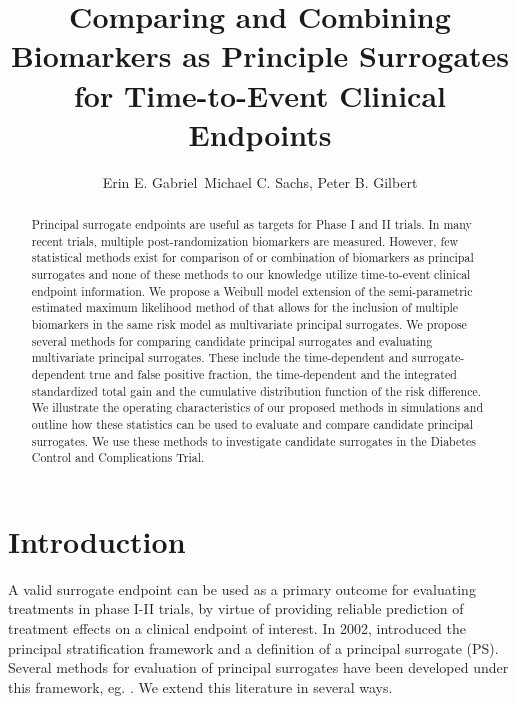 \documentclass[times, doublespace]{simauth}
\begin{document}

\title{Comparing and Combining Biomarkers as Principle Surrogates for Time-to-Event Clinical Endpoints}
\author{Erin E. Gabriel\corrauth\
Michael C. Sachs, Peter B. Gilbert}
\address{Vaccine and Infectious Disease Division, Fred Hutchinson Cancer Research Center\\
\affilnum{b}Kidney Research Institute, University of Washington\\
\affilnum{c}Department of Biostatistics, University of Washington}
\corraddr{egabriel@fhcrc.org}
\begin{abstract}
Principal surrogate endpoints are useful as targets for Phase I and II trials. In many recent trials, multiple post-randomization biomarkers are measured. However, few statistical methods exist for comparison of or combination of biomarkers as principal surrogates and none of these methods to our knowledge utilize time-to-event clinical endpoint information. We propose a Weibull model extension of the semi-parametric estimated maximum likelihood method of \citet{Huang11} that allows for the inclusion of multiple biomarkers in the same risk model as multivariate principal surrogates. We propose several methods for comparing candidate principal surrogates and evaluating multivariate principal surrogates. These include the time-dependent and surrogate-dependent true and false positive fraction, the time-dependent and the integrated standardized total gain and the cumulative distribution function of the risk difference. We illustrate the operating characteristics of our proposed methods in simulations and outline how these statistics can be used to evaluate and compare candidate principal surrogates. We use these methods to investigate candidate surrogates in the Diabetes Control and Complications Trial.
\end{abstract}
\maketitle

\section{Introduction} 
A valid surrogate endpoint can be used as a primary outcome for evaluating treatments in phase I-II trials, by virtue of providing reliable prediction of treatment effects on a clinical endpoint of interest. In 2002, \citet{Frangakis02} introduced the principal stratification framework and a definition of a principal surrogate (PS). Several methods for evaluation of principal surrogates have been developed under this framework, eg. \citep{Taylor05, Follmann06, Gilbert08, Wolfson10, Li10, Huang11, Huang12, Zigler12, Gabriel13}.  We extend this literature in several ways.
\end{document}
